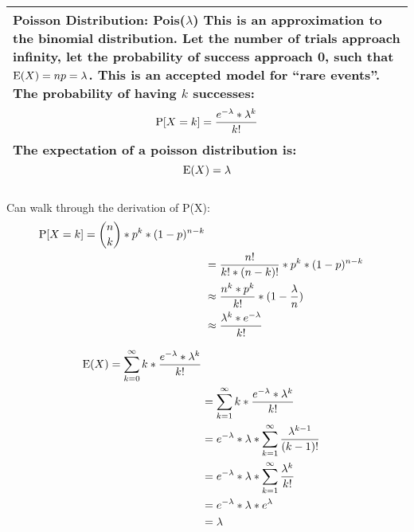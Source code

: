 {\tabulinesep=1mm
\begin{tabu}{|p{16cm} |}
\hline
\vspace{2 mm}
\textbf{Poisson Distribution: Pois($\lambda$)}
This is an approximation to the binomial distribution. Let the number 
of trials approach infinity, let the probability of success approach 0, 
such that $\E(X) = np = \lambda$.  This is an accepted model for 
“rare events”. The probability of having $k$ successes:
\[ \P[X = k] = \frac{e^{-\lambda} * \lambda^k}{k!} \]
The expectation of a poisson distribution is:
\[ \E(X) = \lambda \]
\vspace{5 mm}
\\
\hline
\end{tabu}
}

\begin{solution} %
Can walk through the derivation of P(X):
\begin{equation}
\begin{split}
\P[X = k] = {n \choose k} * p^k * (1 - p)^{n - k} \\ \nonumber
&= \frac{n!}{k! * (n - k)!} * p^k * (1 - p)^{n - k} \\
&\approx \frac{n^k * p^k}{k!} * (1 - \frac{\lambda}{n}) \\
&\approx \frac{\lambda^k * e^{-\lambda}}{k!}
\end{split}
\end{equation}

\begin{equation}
\begin{split}
\E(X) = \sum_{k = 0}^{\infty} k* \frac{e^{-\lambda} * \lambda^k}{k!} \\ \nonumber
&= \sum_{k = 1}^{\infty}k * \frac{e^{-\lambda} * \lambda^k}{k!} \\
&= e^{-\lambda} * \lambda * \sum_{k = 1}^{\infty} \frac{\lambda^{k - 1}}{(k - 1)!} \\
&=  e^{-\lambda} * \lambda * \sum_{k = 1}^{\infty} \frac{\lambda^{k}}{k!} \\
&= e^{-\lambda} * \lambda * e^{\lambda} \\
&= \lambda 
\end{split}
\end{equation}

\end{solution}